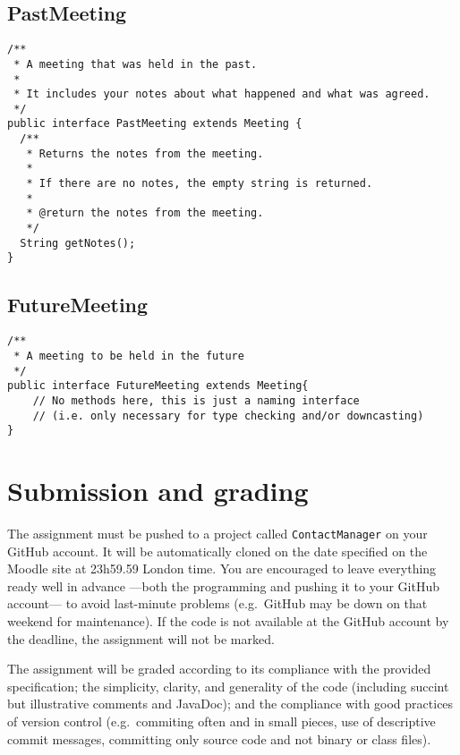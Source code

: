 \documentclass{article}
\begin{document}
\subsection{PastMeeting}
\label{sec:pastmeeting}

\begin{verbatim}
/**
 * A meeting that was held in the past. 
 *
 * It includes your notes about what happened and what was agreed.
 */
public interface PastMeeting extends Meeting {
  /**
   * Returns the notes from the meeting. 
   * 
   * If there are no notes, the empty string is returned. 
   * 
   * @return the notes from the meeting. 
   */
  String getNotes();
}
\end{verbatim}

\subsection{FutureMeeting}
\label{sec:futuremeeting}

\begin{verbatim}
/**
 * A meeting to be held in the future
 */
public interface FutureMeeting extends Meeting{
    // No methods here, this is just a naming interface
    // (i.e. only necessary for type checking and/or downcasting)
}
\end{verbatim}



\section{Submission and grading}
\label{sec:submission-grading}

The assignment must be pushed to a project called
\verb+ContactManager+ on your GitHub account. It will be automatically
cloned on 
%
the date specified on the Moodle site at 23h59.59 London time. 
%
%
%
You are encouraged to
leave everything ready well in advance ---both the programming and
pushing it to your GitHub account--- to avoid last-minute problems 
(e.g.~GitHub may be down on that weekend for maintenance). If the
code is not available at the GitHub account by the deadline, the 
assignment will not be marked. 

The assignment will be graded according to its compliance with the
provided specification; the simplicity, clarity, and generality of
the code (including succint but illustrative comments and JavaDoc);
and the compliance with good practices of version control 
(e.g.~commiting often and in small pieces, use of descriptive commit
messages, committing only source code and not binary or class files). 
\end{document}
